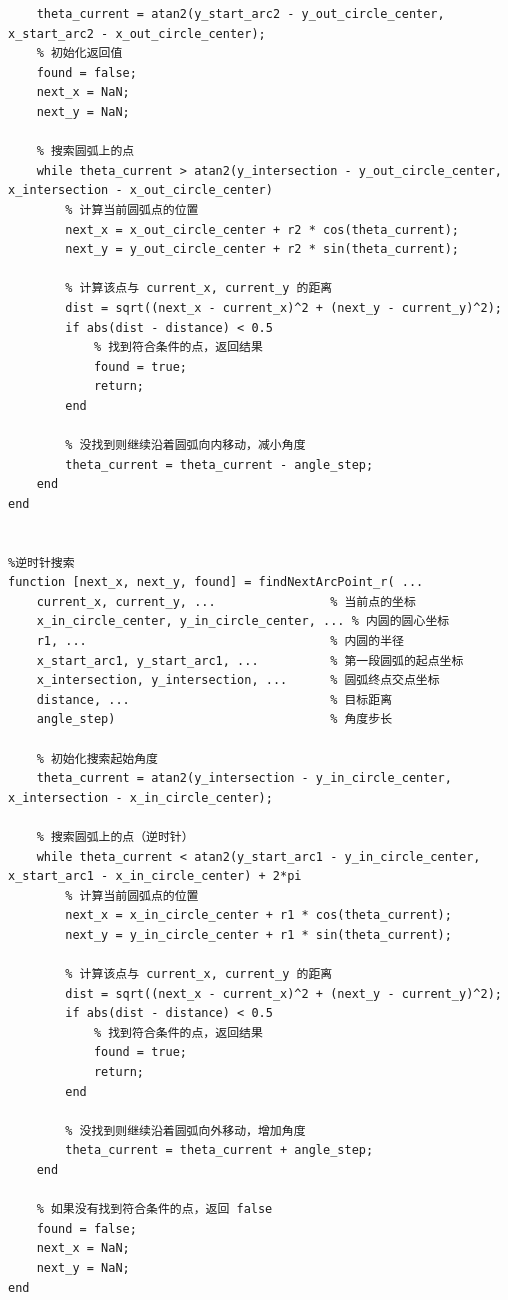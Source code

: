 \documentclass{cumcmthesis1}
\begin{document}
\begin{lstlisting}[caption={求解问题4中-100s到100s位置和速度的代码，并将计算结果保存到result4.xlsx中}, label={lst:eighth_code}]
    % 初始化搜索起始角度
    theta_current = atan2(y_start_arc2 - y_out_circle_center, x_start_arc2 - x_out_circle_center);
    % 初始化返回值
    found = false;
    next_x = NaN;
    next_y = NaN;

    % 搜索圆弧上的点
    while theta_current > atan2(y_intersection - y_out_circle_center, x_intersection - x_out_circle_center)
        % 计算当前圆弧点的位置
        next_x = x_out_circle_center + r2 * cos(theta_current);
        next_y = y_out_circle_center + r2 * sin(theta_current);
        
        % 计算该点与 current_x, current_y 的距离
        dist = sqrt((next_x - current_x)^2 + (next_y - current_y)^2);
        if abs(dist - distance) < 0.5
            % 找到符合条件的点，返回结果
            found = true;
            return;
        end
        
        % 没找到则继续沿着圆弧向内移动，减小角度
        theta_current = theta_current - angle_step;
    end
end


%逆时针搜索
function [next_x, next_y, found] = findNextArcPoint_r( ...
    current_x, current_y, ...                % 当前点的坐标
    x_in_circle_center, y_in_circle_center, ... % 内圆的圆心坐标
    r1, ...                                  % 内圆的半径
    x_start_arc1, y_start_arc1, ...          % 第一段圆弧的起点坐标
    x_intersection, y_intersection, ...      % 圆弧终点交点坐标
    distance, ...                            % 目标距离
    angle_step)                              % 角度步长

    % 初始化搜索起始角度
    theta_current = atan2(y_intersection - y_in_circle_center, x_intersection - x_in_circle_center);

    % 搜索圆弧上的点（逆时针）
    while theta_current < atan2(y_start_arc1 - y_in_circle_center, x_start_arc1 - x_in_circle_center) + 2*pi
        % 计算当前圆弧点的位置
        next_x = x_in_circle_center + r1 * cos(theta_current);
        next_y = y_in_circle_center + r1 * sin(theta_current);
        
        % 计算该点与 current_x, current_y 的距离
        dist = sqrt((next_x - current_x)^2 + (next_y - current_y)^2);
        if abs(dist - distance) < 0.5
            % 找到符合条件的点，返回结果
            found = true;
            return;
        end
        
        % 没找到则继续沿着圆弧向外移动，增加角度
        theta_current = theta_current + angle_step;
    end

    % 如果没有找到符合条件的点，返回 false
    found = false;
    next_x = NaN;
    next_y = NaN;
end



\end{lstlisting}
\end{document}
